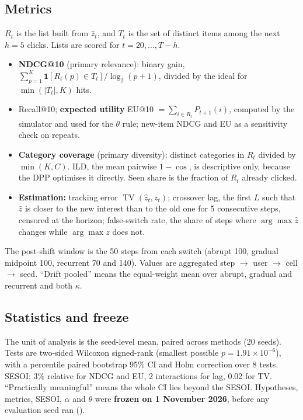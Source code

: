 \documentclass[11pt,a4paper]{article}
\newcommand{\zhat}{\hat{z}}
\newcommand{\TV}{\operatorname{TV}}
\begin{document}
\subsection{Metrics}
$R_t$ is the list built from $\zhat_t$, and $T_t$ is the set of distinct items among the next
$h=5$ clicks. Lists are scored for $t=20,\dots,T-h$.
\begin{itemize}
  \item \textbf{NDCG@10} (primary relevance): binary gain,
        $\sum_{p=1}^{K}\mathbf 1[R_t(p)\in T_t]/\log_2(p+1)$, divided by the ideal for
        $\min(|T_t|,K)$ hits.
  \item Recall@10; \textbf{expected utility} EU@10 $=\sum_{i\in R_t}P_{t+1}(i)$, computed by
        the simulator and used for the $\theta$ rule; new-item NDCG and EU as a sensitivity
        check on repeats.
  \item \textbf{Category coverage} (primary diversity): distinct categories in $R_t$ divided by
        $\min(K,C)$. ILD, the mean pairwise $1-\cos$, is descriptive only, because the DPP
        optimises it directly. Seen share is the fraction of $R_t$ already clicked.
  \item \textbf{Estimation:} tracking error $\TV(\zhat_t,z_t)$; crossover lag, the first $L$
        such that $\zhat$ is closer to the new interest than to the old one for 5 consecutive
        steps, censored at the horizon; false-switch rate, the share of steps where
        $\arg\max\zhat$ changes while $\arg\max z$ does not.
\end{itemize}
The post-shift window is the 50 steps from each switch (abrupt 100, gradual midpoint 100,
recurrent 70 and 140). Values are aggregated step $\to$ user $\to$ cell $\to$ seed.
``Drift pooled'' means the equal-weight mean over abrupt, gradual and recurrent and both
$\kappa$.

\subsection{Statistics and freeze}
The unit of analysis is the seed-level mean, paired across methods (20 seeds). Tests are
two-sided Wilcoxon signed-rank (smallest possible $p=1.91\times10^{-6}$), with a percentile
paired bootstrap 95\% CI and Holm correction over 8 tests. SESOI: 3\% relative for NDCG and EU,
2 interactions for lag, 0.02 for TV. ``Practically meaningful'' means the whole CI lies beyond
the SESOI. Hypotheses, metrics, SESOI, $\alpha$ and $\theta$ were \textbf{frozen on 1 November
2026}, before any evaluation seed ran ().
\end{document}
